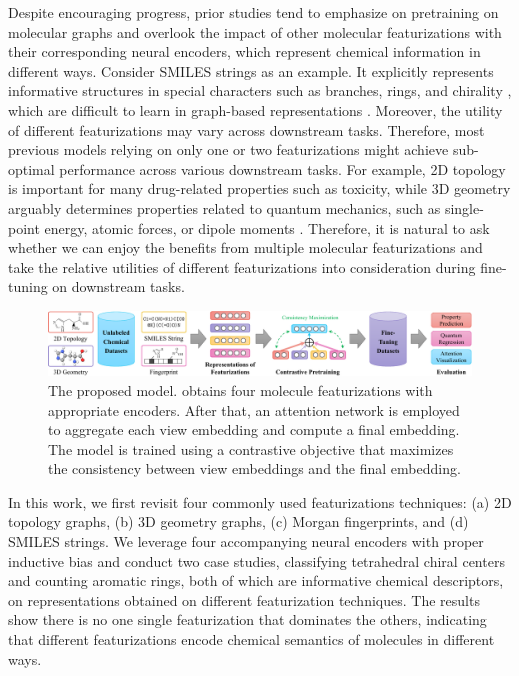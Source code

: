 Despite encouraging progress, prior studies tend to emphasize on pretraining on molecular graphs and overlook the impact of other molecular featurizations with their corresponding neural encoders, which represent chemical information in different ways.
Consider SMILES strings as an example. It explicitly represents informative structures in special characters such as branches, rings, and chirality \cite{Ross:2022hh}, which are difficult to learn in graph-based representations \cite{Chen:2020vz}.
Moreover, the utility of different featurizations may vary across downstream tasks. Therefore, most previous models relying on only one or two featurizations might achieve sub-optimal performance across various downstream tasks.
For example, 2D topology is important for many drug-related properties such as toxicity, while 3D geometry arguably determines properties related to quantum mechanics, such as single-point energy, atomic forces, or dipole moments \cite{Zhang:2018dp,Smith:2017an}.
Therefore, it is natural to ask whether we can enjoy the benefits from multiple molecular featurizations and take the relative utilities of different featurizations into consideration during fine-tuning on downstream tasks.

\begin{figure}
	\centering
	\includegraphics[width=\linewidth,bb=0 0 811 132]{figures/model.pdf}
	\caption{The proposed \themodel model. \themodel obtains four molecule featurizations with appropriate encoders. After that, an attention network is employed to aggregate each view embedding and compute a final embedding. The model is trained using a contrastive objective that maximizes the consistency between view embeddings and the final embedding.}
	\label{fig:model}
\end{figure}

In this work, we first revisit four commonly used featurizations techniques: (a) 2D topology graphs, (b) 3D geometry graphs, (c) Morgan fingerprints, and (d) SMILES strings.
We leverage four accompanying neural encoders with proper inductive bias and conduct two case studies, classifying tetrahedral chiral centers and counting aromatic rings, both of which are informative chemical descriptors, on representations obtained on different featurization techniques.
The results show there is no one single featurization that dominates the others, indicating that different featurizations encode chemical semantics of molecules in different ways.

